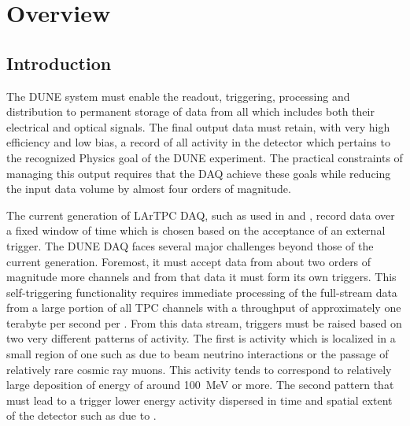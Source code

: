 \section{Overview}
\label{sec:fd-daq-ov}


\subsection{Introduction}
\label{sec:fd-daq-intro}

The DUNE   system must enable the readout,
triggering, processing and distribution to permanent storage of data
from all  which includes both their electrical
 and optical  signals.  
The final output data must retain, with very high efficiency and low
bias, a record of all activity in the detector which pertains to the
recognized Physics goal of the DUNE experiment. 
The practical constraints of managing this output requires that the
DAQ achieve these goals while reducing the input data volume by almost four
orders of magnitude.

The current generation of LArTPC DAQ, such as used in
 and \microboone, record data over a fixed window of
time which is chosen based on the acceptance of an external trigger. 
The DUNE DAQ faces several major challenges beyond those of the
current generation. 
Foremost, it must accept data from about two orders of magnitude more
channels and from that data it must form its own triggers.
This self-triggering functionality requires immediate processing of
the full-stream data from a large portion of all TPC channels with a
throughput of approximately one terabyte per second per
. 
From this data stream, triggers must be raised based on two very
different patterns of activity. 
The first is activity which is localized in a small region of one
 such as due to beam neutrino interactions or the
passage of relatively rare cosmic ray muons. 
This activity tends to correspond to relatively large deposition of
energy of around \SI{100}{\MeV} or more. 
The second pattern that must lead to a trigger lower energy activity
dispersed in time and spatial extent of the detector such as due to
.

